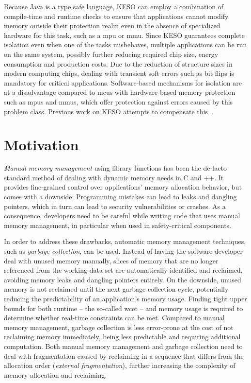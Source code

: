 		Because Java is a type safe language, KESO can employ a combination of compile-time and runtime checks to ensure
		that applications cannot modify memory outside their protection realm even in the absence of specialized hardware
		for this task, such as a \gls{mpu} or \gls{mmu}. Since KESO guarantees complete isolation even when one of the tasks
		misbehaves, multiple applications can be run on the same system, possibly further reducing required chip size,
		energy consumption and production costs. Due to the reduction of structure sizes in modern computing chips, dealing
		with transient soft errors such as bit flips is mandatory for critical applications. Software-based mechanisms for
		isolation are at a disadvantage compared to \glspl{mcu} with hardware-based memory protection such as \glspl{mpu}
		and \glspl{mmu}, which offer protection against errors caused by this problem class. Previous work on KESO attempts
		to compensate this~\cite{thomm:11:jtres, stilkerich:13:lctes}.

	\section{Motivation}
		\label{sec:intro:motivation}

		\emph{Manual memory management} using library functions has been the de-facto standard method of dealing with
		dynamic memory needs in C and \C++{}. It provides fine-grained control over applications' memory allocation
		behavior, but comes with a downside: Programming mistakes can lead to leaks and dangling pointers, which in turn can
		lead to security vulnerabilities or crashes. As a consequence, developers need to be careful while writing code that
		uses manual memory management, in particular when used in safety-critical components.

		In order to address these drawbacks, automatic memory management techniques, such as \emph{garbage collection}, can
		be used. Instead of having the software developer deal with unused memory manually, slices of memory that are no
		longer referenced from the working data set are automatically identified and reclaimed, avoiding memory leaks and
		dangling pointers entirely. On the downside, unused memory is not reclaimed until the next garbage collection cycle,
		potentially reducing the predictability of an application's memory usage. Finding tight upper bounds for both
		runtime – the so-called \gls{wcet} – and memory usage is required to determine whether real-time constraints can be
		met. Compared to manual memory management, garbage collection is less error-prone at the cost of not reclaiming
		memory immediately, being less predictable and requiring additional computation. Both manual memory management and
		garbage collection need to deal with fragmentation caused by reclaiming in a sequence that differs from the
		allocation order (\emph{external fragmentation}), further increasing the complexity of memory allocation and
		reclaiming.

